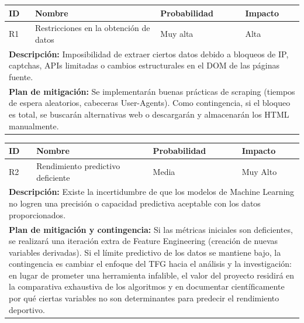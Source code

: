\begin{center}
\small
\setlength{\tabcolsep}{6pt}
\begin{tabular}{|p{}|p{}|p{}|p{}|}
\hline
\textbf{ID} & \textbf{Nombre} & \textbf{Probabilidad} & \textbf{Impacto} \\
\hline
R1 & Restricciones en la obtención de datos & Muy alta & Alta \\
\hline
\multicolumn{4}{|p{0.9\textwidth}|}{\textbf{Descripción:} Imposibilidad de extraer ciertos datos debido a bloqueos de IP, captchas, APIs limitadas o cambios estructurales en el DOM de las páginas fuente.} \\
\hline
\multicolumn{4}{|p{0.9\textwidth}|}{\textbf{Plan de mitigación:} Se implementarán buenas prácticas de scraping (tiempos de espera aleatorios, cabeceras User-Agents). Como contingencia, si el bloqueo es total, se buscarán alternativas web o descargarán y almacenarán los HTML manualmente.} \\
\hline
\end{tabular}
\end{center}

\vspace{0.3cm}

\begin{center}
\small
\setlength{\tabcolsep}{6pt}
\begin{tabular}{|p{}|p{}|p{}|p{}|}
\hline
\textbf{ID} & \textbf{Nombre} & \textbf{Probabilidad} & \textbf{Impacto} \\
\hline
R2 & Rendimiento predictivo deficiente & Media & Muy Alto \\
\hline
\multicolumn{4}{|p{0.9\textwidth}|}{\textbf{Descripción:} Existe la incertidumbre de que los modelos de Machine Learning no logren una precisión o capacidad predictiva aceptable con los datos proporcionados.} \\
\hline
\multicolumn{4}{|p{0.9\textwidth}|}{\textbf{Plan de mitigación y contingencia:} Si las métricas iniciales son deficientes, se realizará una iteración extra de Feature Engineering (creación de nuevas variables derivadas). Si el límite predictivo de los datos se mantiene bajo, la contingencia es cambiar el enfoque del TFG hacia el análisis y la investigación: en lugar de prometer una herramienta infalible, el valor del proyecto residirá en la comparativa exhaustiva de los algoritmos y en documentar científicamente por qué ciertas variables no son determinantes para predecir el rendimiento deportivo.} \\
\hline
\end{tabular}
\end{center}

